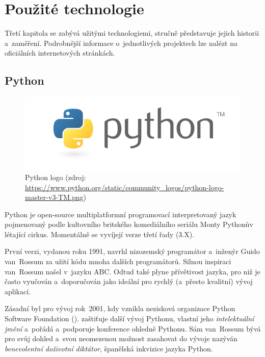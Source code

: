 \chapter{Použité technologie}
\label{3-technologie}

Třetí kapitola se zabývá užitými technologiemi, stručně představuje jejich historii a~zaměření.
Podrobnější informace o~jednotlivých projektech lze nalézt na oficiálních internetových stránkách. 


\section{Python}
\label{python}

  \begin{figure}[H]
   \centering
	\includegraphics[scale=0.5]{./pictures/python-logo-master-v3-TM.png}
	\caption[Python logo]{Python logo 
      (zdroj: \url{https://www.python.org/static/community_logos/python-logo-master-v3-TM.png})}
      \label{fig:python}
  \end{figure}

Python je open-source multiplatformní programovací interpretovaný jazyk pojme\-novaný podle
kultovního britského komediálního seriálu Monty Pythonův létající cirkus. Momentálně se
vyvíjejí verze třetí řady (3.X). 

První verzi, vydanou roku 1991, navrhl nizozemský programátor a~inženýr Guido van~Rossum za užití kódu
mnoha dalších programátorů. Silnou inspiraci van~Rossum našel v~jazyku ABC. Odtud také plyne
přívětivost jazyka, pro niž je často vyučován a~doporučován jako ideální pro rychlý
(a~přesto kvalitní) vývoj aplikací. 

Zásadní byl pro vývoj rok~2001, kdy vznikla nezisková organizace Python Software
Foundation ().  zaštiťuje další vývoj Pythonu, vlastní jeho
\textit{intelektuální jmění} a~pořádá a~podporuje konference ohledně Pythonu. Sám van~Rossum bývá
pro svůj dohled a~svou neomezenou možnost zasahovat do vývoje nazýván \textit{benevolentní doživotní
diktátor}, španělská inkvizice jazyka Python. 

